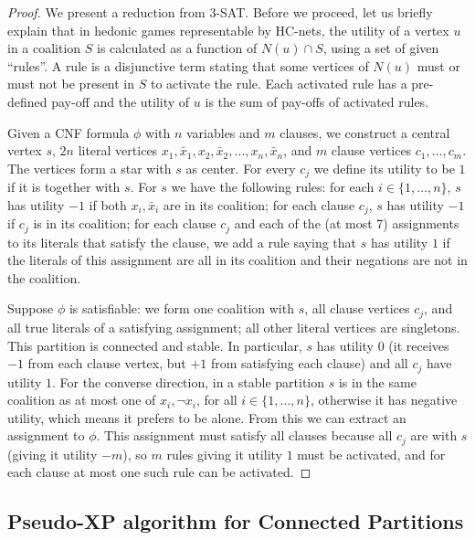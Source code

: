 \documentclass[letterpaper,USenglish,cleveref, autoref, thm-restate]{lipics-v2021}
\begin{document}
\begin{proof}

We present a reduction from \textsc{3-SAT}. Before we proceed, let us briefly
explain that in hedonic games representable by HC-nets, the utility of a vertex
$u$ in a coalition $S$ is calculated as a function of $N(u)\cap S$, using a set
of given ``rules''. A rule is a disjunctive term stating that some vertices of
$N(u)$ must or must not be present in $S$ to activate the rule. Each activated
rule has a pre-defined pay-off and the utility of $u$ is the sum of pay-offs of
activated rules.

Given a CNF formula $\phi$ with $n$ variables and $m$ clauses, we construct a
central vertex $s$, $2n$ literal vertices $x_1, \bar{x}_1, x_2,
\bar{x}_2,\ldots, x_n, \bar{x}_n$, and $m$ clause vertices $c_1,\ldots,c_m$.
The vertices form a star with $s$ as center. For every $c_j$ we define its
utility to be $1$ if it is together with $s$. For $s$ we have the following
rules: for each $i\in\{1,\ldots,n\}$, $s$ has utility $-1$ if both $x_i,
\bar{x}_i$ are in its coalition; for each clause $c_j$, $s$ has utility $-1$ if
$c_j$ is in its coalition; for each clause $c_j$ and each of the (at most 7)
assignments to its literals that satisfy the clause, we add a rule saying that
$s$ has utility $1$ if the literals of this assignment are all in its coalition
and their negations are not in the coalition.

Suppose $\phi$ is satisfiable: we form one coalition with $s$, all clause
vertices $c_j$, and all true literals of a satisfying assignment; all other
literal vertices are singletons. This partition is connected and stable. In
particular, $s$ has utility $0$ (it receives $-1$ from each clause vertex, but
$+1$ from satisfying each clause) and all $c_j$ have utility $1$.  For the
converse direction, in a stable partition $s$ is in the same coalition as at
most one of $x_i, \neg x_i$, for all $i\in\{1,\ldots,n\}$, otherwise it has
negative utility, which means it prefers to be alone. From this we can extract
an assignment to $\phi$. This assignment must satisfy all clauses because all
$c_j$ are with $s$ (giving it utility $-m$), so $m$ rules giving it utility $1$
must be activated, and for each clause at most one such rule can be activated.
\end{proof}


\subsection{Pseudo-XP algorithm for Connected Partitions}\label{sec:pseudoXP}
\end{document}
